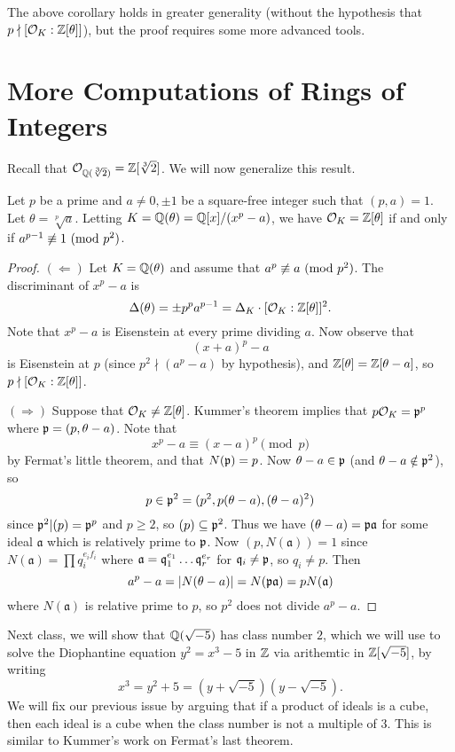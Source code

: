 \begin{remark}
  The above corollary holds in greater generality
  (without the hypothesis that $p \nmid [\mathcal{O}_K : \mathbb{Z}[\theta]]$),
  but the proof requires some more advanced tools.
\end{remark}

\section{More Computations of Rings of Integers}

\begin{remark}
  Recall that $\mathcal{O}_{\mathbb{Q}(\sqrt[3]{2})} = \mathbb{Z}[\sqrt[3]{2}]$.
  We will now generalize this result.
\end{remark}

\begin{theorem}
  Let $p$ be a prime and $a \ne 0, \pm 1$ be a
  square-free integer such that $(p, a) = 1$.
  Let $\theta = \sqrt[p]{a}$. Letting
  $K = \mathbb{Q}(\theta) = \mathbb{Q}[x] / (x^p - a)$, we have
  $\mathcal{O}_K = \mathbb{Z}[\theta]$
  if and only if $a^{p - 1} \not\equiv 1 \ (\mathrm{mod}\ p^2)$.
\end{theorem}

\begin{proof}
  $(\Leftarrow)$
  Let $K = \mathbb{Q}(\theta)$ and assume that
  $a^p \not\equiv a \ (\mathrm{mod}\ p^2)$. The discriminant
  of $x^p - a$ is
  \[
    \Delta(\theta) = \pm p^p a^{p - 1}
    = \Delta_K \cdot [\mathcal{O}_K : \mathbb{Z}[\theta]]^2.
  \]
  Note that $x^p - a$ is Eisenstein at every prime
  dividing $a$. Now observe that
  \[
    (x + a)^p - a
  \]
  is Eisenstein at $p$ (since $p^2 \nmid (a^p - a)$
  by hypothesis), and $\mathbb{Z}[\theta] = \mathbb{Z}[\theta - a]$,
  so $p \nmid [\mathcal{O}_K : \mathbb{Z}[\theta]]$.

  $(\Rightarrow)$ Suppose that $\mathcal{O}_K \ne \mathbb{Z}[\theta]$.
  Kummer's theorem implies that $p \mathcal{O}_K = \mathfrak{p}^p$ where
  $\mathfrak{p} = (p, \theta - a)$. Note that
  \[
    x^p - a \equiv (x - a)^p \pmod{p}
  \]
  by Fermat's little theorem, and that $N(\mathfrak{p}) = p$.
  Now $\theta - a \in \mathfrak{p}$ (and $\theta - a \notin \mathfrak{p}^2$), so
  \[
    p \in \mathfrak{p}^2 = (p^2, p(\theta - a), (\theta - a)^2)
  \]
  since $\mathfrak{p}^2 | (p) = \mathfrak{p}^p$ and $p \ge 2$, so
  $(p) \subseteq \mathfrak{p}^2$. Thus we have
  $(\theta - a) = \mathfrak{p} \mathfrak{a}$
  for some ideal $\mathfrak{a}$ which is relatively
  prime to $\mathfrak{p}$. Now
  $(p, N(\mathfrak{a})) = 1$ since
  $N(\mathfrak{a}) = \prod q_i^{e_i f_i}$ where
  $\mathfrak{a} = \mathfrak{q}_1^{e_1} \dots \mathfrak{q}_r^{e_r}$ for
  $\mathfrak{q}_i \ne \mathfrak{p}$, so $q_i \ne p$. Then
  \[
    a^p - a = |N(\theta - a)| = N(\mathfrak{p} \mathfrak{a})
    = p N(\mathfrak{a})
  \]
  where $N(\mathfrak{a})$ is relative prime to $p$,
  so $p^2$ does not divide $a^p - a$.
\end{proof}

\begin{remark}
  Next class, we will show that $\mathbb{Q}(\sqrt{-5})$
  has class number $2$, which we will use to solve
  the Diophantine equation $y^2 = x^3 - 5$ in $\mathbb{Z}$
  via arithemtic in $\mathbb{Z}[\sqrt{-5}]$, by writing
  \[
    x^3 = y^2 + 5 = (y + \sqrt{-5})(y - \sqrt{-5}).
  \]
  We will fix our previous issue by arguing
  that if a product of ideals is
  a cube, then each ideal is a cube when the class
  number is not a multiple of $3$. This is
  similar to Kummer's work on Fermat's last theorem.
\end{remark}

